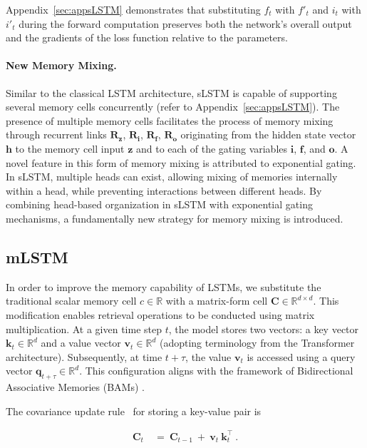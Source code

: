 Appendix~\ref{sec:appsLSTM} demonstrates that substituting $f_t$ with $f'_t$ and $i_t$ with $i'_t$ during the forward computation preserves both the network's overall output and the gradients of the loss function relative to the parameters.

\paragraph{New Memory Mixing.} Similar to the classical LSTM architecture, sLSTM is capable of supporting several memory cells concurrently (refer to Appendix~\ref{sec:appsLSTM}). The presence of multiple memory cells facilitates the process of memory mixing through recurrent links $\mathbf{R}_{\mathbf{z}}$, $\mathbf{R}_{\mathbf{i}}$, $\mathbf{R}_{\mathbf{f}}$, $\mathbf{R}_{\mathbf{o}}$ originating from the hidden state vector $\mathbf{h}$ to the memory cell input $\mathbf{z}$ and to each of the gating variables $\mathbf{i}$, $\mathbf{f}$, and $\mathbf{o}$. A novel feature in this form of memory mixing is attributed to exponential gating. In sLSTM, multiple heads can exist, allowing mixing of memories internally within a head, while preventing interactions between different heads. By combining head-based organization in sLSTM with exponential gating mechanisms, a fundamentally new strategy for memory mixing is introduced.

\subsection{mLSTM}
\label{sec:mLSTM}

In order to improve the memory capability of LSTMs, we substitute the traditional scalar memory cell $c \in \mathbb{R}$ with a matrix-form cell $\mathbf{C} \in \mathbb{R}^{d \times d}$. This modification enables retrieval operations to be conducted using matrix multiplication. At a given time step $t$, the model stores two vectors: a key vector $\mathbf{k}_t \in \mathbb{R}^d$ and a value vector $\mathbf{v}_t \in \mathbb{R}^d$ (adopting terminology from the Transformer architecture). Subsequently, at time $t + \tau$, the value $\mathbf{v}_t$ is accessed using a query vector $\mathbf{q}_{t+\tau} \in \mathbb{R}^d$. This configuration aligns with the framework of Bidirectional Associative Memories (BAMs) \citep{Kohonen:72,Anderson:72,Nakano:72,Anderson:77}.

The covariance update rule~\citep{Sejnowski:77,Dayan:91} for storing a key-value pair is

\begin{align}
\mathbf{C}_t \ &= \ \mathbf{C}_{t-1} \ + \ \mathbf{v}_{t} \ \mathbf{k}_t^\top \ .
\end{align}

